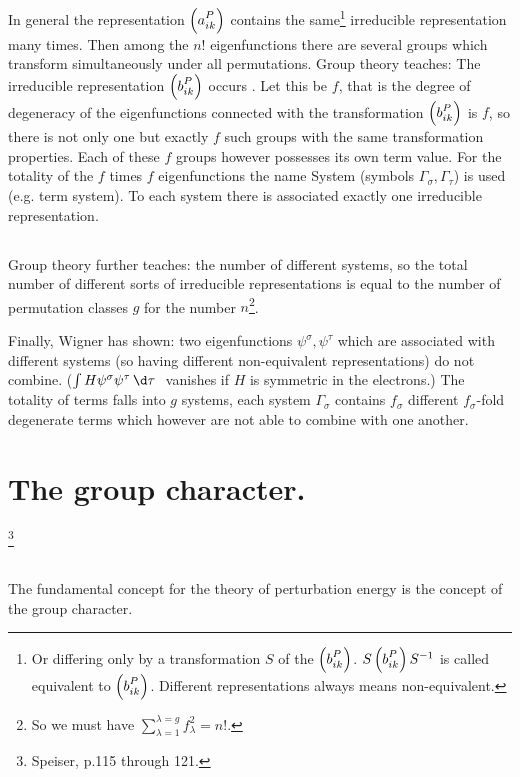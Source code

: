 \begin{paper}{1}
\subsection{}
In general the representation $\Aikp{a}{ik}{P}$ contains the same\footnote{Or differing only by a transformation $S$ of the $\Aikp{b}{ik}{P}$. $S\Aikp{b}{ik}{P}S^{-1}$ is called equivalent to $\Aikp{b}{ik}{P}$. Different representations always means non-equivalent.} irreducible representation 
many times. Then among the $n!$ eigenfunctions there are several groups which transform simultaneously under all permutations. Group theory teaches: The irreducible representation $\Aikp{b}{ik}{P}$ occurs . Let this be $f$, that is the degree of degeneracy of the eigenfunctions connected with the transformation $\Aikp{b}{ik}{P}$ is $f$, so there is not only one but exactly $f$ such groups with the same transformation properties. Each of these $f$ groups however possesses its own term value. For the totality of the $f$ times $f$ eigenfunctions the name System (symbols $\Gamma_\sigma, \Gamma_\tau$) is used (e.g. term system). To each system there is associated exactly one irreducible representation.

\subsection{}
Group theory further teaches: the number of different systems, so the total number of different sorts of irreducible representations is equal to the number of permutation classes $g$ for the number $n$\footnote{So we must have $\sum\limits_{\lambda=1}^{\lambda=g}f_\lambda^2 = n!$.}.

Finally, Wigner has shown: two eigenfunctions $\psi^\sigma,\psi^\tau$ which are associated with different systems (so having different non-equivalent representations) do not combine. ($\int H\psi^\sigma\psi^\tau\D\tau$ vanishes if $H$ is symmetric in the electrons.) The totality of terms falls into $g$ systems, each system $\Gamma_\sigma$ contains $f_\sigma$ different $f_\sigma$-fold degenerate terms which however are not able to combine with one another.

\section{The group character.}\footnote{Speiser, p.115 through 121.}
\subsection{} The fundamental concept for the theory of perturbation energy is the concept of the group character.


\end{paper}
